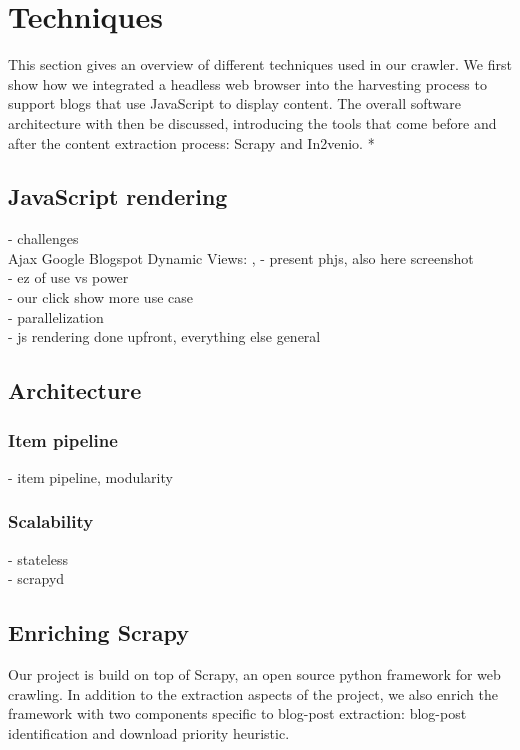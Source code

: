 \section{Techniques}

This section gives an overview of different techniques used in our crawler. We first show how we integrated a headless web browser into the harvesting process to support blogs that use JavaScript to display content. The overall software architecture with then be discussed, introducing the tools that come before and after the content extraction process: Scrapy and In2venio. *

\subsection{JavaScript rendering}
- challenges \\
Ajax
Google Blogspot Dynamic Views: , 
- present phjs, also here screenshot \\
- ez of use vs power \\
- our click show more use case \\
- parallelization \\
- js rendering done upfront, everything else general \\

\subsection{Architecture}
\subsubsection{Item pipeline}
- item pipeline, modularity \\

\subsubsection{Scalability}
- stateless \\
- scrapyd \\


\subsection{Enriching Scrapy}
Our project is build on top of Scrapy, an open source python framework for web crawling. In addition to the extraction aspects of the project, we also enrich the framework with two components specific to blog-post extraction: blog-post identification and download priority heuristic.

